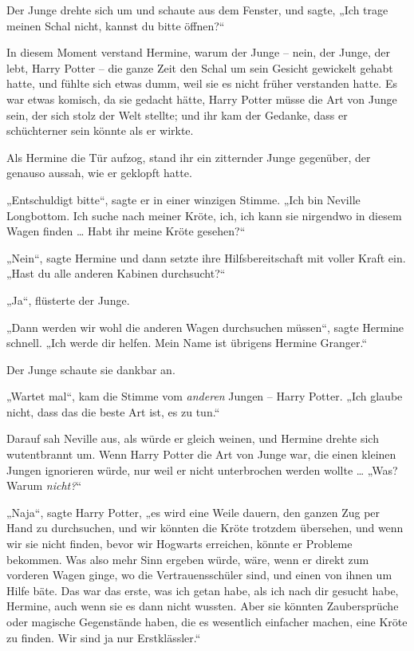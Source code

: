 {Der Junge drehte sich um und schaute aus dem Fenster, und sagte, „Ich trage meinen Schal nicht, kannst du bitte öffnen?“

In diesem Moment verstand Hermine, warum der Junge -- nein, der Junge, der lebt, Harry Potter -- die ganze Zeit den Schal um sein Gesicht gewickelt gehabt hatte, und fühlte sich etwas dumm, weil sie es nicht früher verstanden hatte. Es war etwas komisch, da sie gedacht hätte, Harry Potter müsse die Art von Junge sein, der sich stolz der Welt stellte; und ihr kam der Gedanke, dass er schüchterner sein könnte als er wirkte.

Als Hermine die Tür aufzog, stand ihr ein zitternder Junge gegenüber, der genauso aussah, wie er geklopft hatte.

„Entschuldigt bitte“, sagte er in einer winzigen Stimme. „Ich bin Neville Longbottom. Ich suche nach meiner Kröte, ich, ich kann sie nirgendwo in diesem Wagen finden … Habt ihr meine Kröte gesehen?“

„Nein“, sagte Hermine und dann setzte ihre Hilfsbereitschaft mit voller Kraft ein. „Hast du alle anderen Kabinen durchsucht?“

„Ja“, flüsterte der Junge.

„Dann werden wir wohl die anderen Wagen durchsuchen müssen“, sagte Hermine schnell. „Ich werde dir helfen. Mein Name ist übrigens Hermine Granger.“

Der Junge schaute sie dankbar an.

„Wartet mal“, kam die Stimme vom \emph{anderen} Jungen -- Harry Potter. „Ich glaube nicht, dass das die beste Art ist, es zu tun.“

Darauf sah Neville aus, als würde er gleich weinen, und Hermine drehte sich wutentbrannt um. Wenn Harry Potter die Art von Junge war, die einen kleinen Jungen ignorieren würde, nur weil er nicht unterbrochen werden wollte … „Was? Warum \emph{nicht?}“

„Naja“, sagte Harry Potter, „es wird eine Weile dauern, den ganzen Zug per Hand zu durchsuchen, und wir könnten die Kröte trotzdem übersehen, und wenn wir sie nicht finden, bevor wir Hogwarts erreichen, könnte er Probleme bekommen. Was also mehr Sinn ergeben würde, wäre, wenn er direkt zum vorderen Wagen ginge, wo die Vertrauensschüler sind, und einen von ihnen um Hilfe bäte. Das war das erste, was ich getan habe, als ich nach dir gesucht habe, Hermine, auch wenn sie es dann nicht wussten. Aber sie könnten Zaubersprüche oder magische Gegenstände haben, die es wesentlich einfacher machen, eine Kröte zu finden. Wir sind ja nur Erstklässler.“

}
